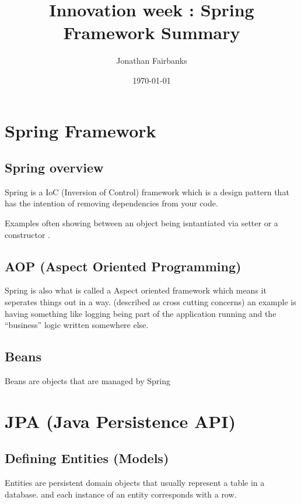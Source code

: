 \documentclass[11pt]{article}
\author{Jonathan Fairbanks}
\date{\today}
\title{Innovation week : Spring Framework Summary}
\begin{document}
\maketitle
\tableofcontents



\section{Spring Framework}
\label{sec:orgd190ac7}
\subsection{Spring overview}
\label{sec:org60bc6db}
Spring is a IoC (Inversion of Control) framework which is a design pattern that has the intention of removing dependencies from your code.

Examples often showing between an object being isntantiated via setter or a constructor .
\subsection{AOP (Aspect Oriented Programming)}
\label{sec:orgd45b2b0}
Spring is also what is called a Aspect oriented framework which means it seperates things out in a way. (described as cross cutting concerns) an example is having something like logging being part of the application running and the ``business'' logic written somewhere else.
\subsection{Beans}
\label{sec:orga5cc3c3}
Beans are objects that are managed by Spring
\section{JPA (Java Persistence API)}
\label{sec:orge19884e}
\subsection{Defining Entities (Models)}
\label{sec:org4c4b611}
Entities are persistent domain objects that usually represent a table in a database. and each instance of an entity corresponds with a row.
\end{document}
